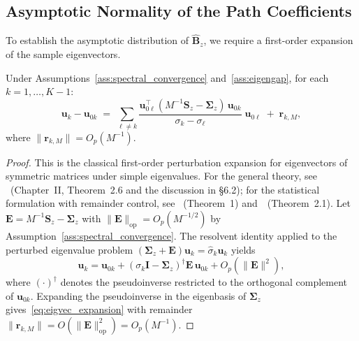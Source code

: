 \subsection{Asymptotic Normality of the Path Coefficients}
\label{subsec:asymptotic_normality}

To establish the asymptotic distribution of $\hat{\mathbf{B}}_z$, we
require a first-order expansion of the sample eigenvectors.

\begin{lemma}
\label{lem:eigvec_expansion}
Under Assumptions~\ref{ass:spectral_convergence}
and~\ref{ass:eigengap}, for each $k=1,\dots,K{-}1$:
\begin{equation}
  \mathbf{u}_k - \mathbf{u}_{0k}
  \;=\;
  \sum_{\ell\neq k}
  \frac{\mathbf{u}_{0\ell}^{\!\top}
        (M^{-1}\mathbf{S}_z - \boldsymbol{\Sigma}_z)\,
        \mathbf{u}_{0k}}
       {\sigma_k - \sigma_\ell}\;
  \mathbf{u}_{0\ell}
  \;+\;
  \mathbf{r}_{k,M},
  \label{eq:eigvec_expansion}
\end{equation}
where $\|\mathbf{r}_{k,M}\| = O_p(M^{-1})$.
\end{lemma}

\begin{proof}
This is the classical first-order perturbation expansion for
eigenvectors of symmetric matrices under simple eigenvalues. For the
general theory, see \citet{kato1995perturbation}~(Chapter~II,
Theorem~2.6 and the discussion in \S6.2);
for the statistical formulation with remainder control, see
\citet{anderson1963asymptotic}~(Theorem~1)
and~\citet{tyler1981asymptotic}~(Theorem~2.1).
Let $\mathbf{E} = M^{-1}\mathbf{S}_z - \boldsymbol{\Sigma}_z$ with
$\|\mathbf{E}\|_{\mathrm{op}} = O_p(M^{-1/2})$ by
Assumption~\ref{ass:spectral_convergence}.
The resolvent identity applied to the perturbed eigenvalue problem
$(\boldsymbol{\Sigma}_z + \mathbf{E})\mathbf{u}_k
= \hat\sigma_k\mathbf{u}_k$ yields
\[
  \mathbf{u}_k
  = \mathbf{u}_{0k}
    + (\sigma_k\mathbf{I} - \boldsymbol{\Sigma}_z)^{\dagger}
      \mathbf{E}\,\mathbf{u}_{0k}
    + O_p(\|\mathbf{E}\|^2),
\]
where $(\cdot)^{\dagger}$ denotes the pseudoinverse restricted to the
orthogonal complement of $\mathbf{u}_{0k}$.
Expanding the pseudoinverse in the eigenbasis of $\boldsymbol{\Sigma}_z$
gives~\eqref{eq:eigvec_expansion} with remainder
$\|\mathbf{r}_{k,M}\| = O(\|\mathbf{E}\|^2_{\mathrm{op}})
= O_p(M^{-1})$.
\end{proof}

